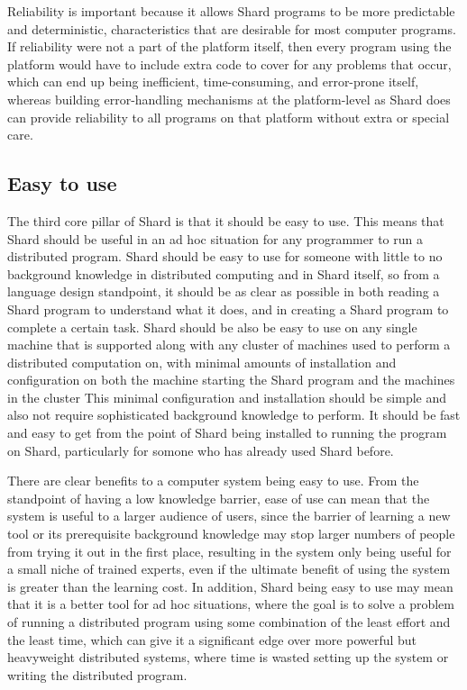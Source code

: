\documentclass[twoside]{report}
\begin{document}
Reliability is important because it allows Shard programs to be more predictable and deterministic, characteristics that are desirable for most computer programs. If reliability were not a part of the platform itself, then every program using the platform would have to include extra code to cover for any problems that occur, which can end up being inefficient, time-consuming, and error-prone itself, whereas building error-handling mechanisms at the platform-level as Shard does can provide reliability to all programs on that platform without extra or special care.

\subsection{Easy to use}

The third core pillar of Shard is that it should be easy to use.
This means that Shard should be useful in an ad hoc situation for any programmer to run a distributed program.
Shard should be easy to use for someone with little to no background knowledge in distributed computing and in Shard itself, so from a language design standpoint, it should be as clear as possible in both reading a Shard program to understand what it does, and in creating a Shard program to complete a certain task.
Shard should be also be easy to use on any single machine that is supported along with any cluster of machines used to perform a distributed computation on, with minimal amounts of installation and configuration on both the machine starting the Shard program and the machines in the cluster
This minimal configuration and installation should be simple and also not require sophisticated background knowledge to perform.
It should be fast and easy to get from the point of Shard being installed to running the program on Shard, particularly for somone who has already used Shard before.

There are clear benefits to a computer system being easy to use.
From the standpoint of having a low knowledge barrier, ease of use can mean that the system is useful to a larger audience of users, since the barrier of learning a new tool or its prerequisite background knowledge may stop larger numbers of people from trying it out in the first place, resulting in the system only being useful for a small niche of trained experts, even if the ultimate benefit of using the system is greater than the learning cost.
In addition, Shard being easy to use may mean that it is a better tool for ad hoc situations, where the goal is to solve a problem of running a distributed program using some combination of the least effort and the least time, which can give it a significant edge over more powerful but heavyweight distributed systems, where time is wasted setting up the system or writing the distributed program.
\end{document}
